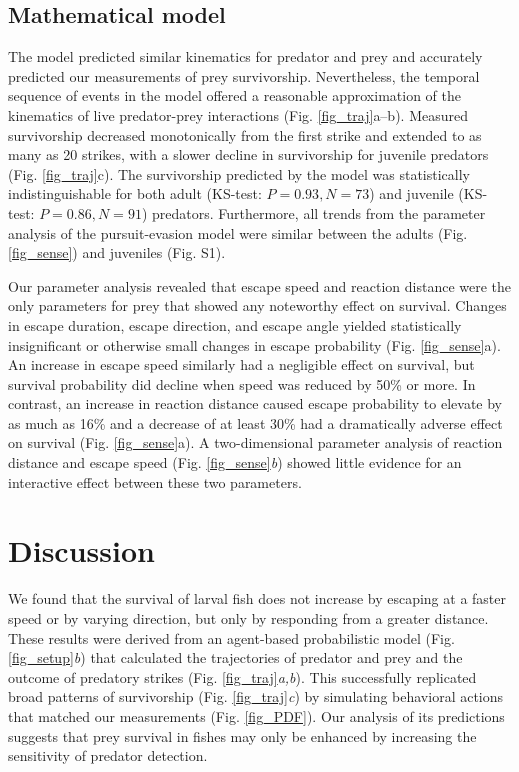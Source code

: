 \documentclass[]{rsos}%
\begin{document}
\subsection{Mathematical model} %

The model predicted similar kinematics for predator and prey and accurately predicted our measurements of prey survivorship. 
Nevertheless, the temporal sequence of events in the model offered a reasonable approximation of the kinematics of live predator-prey interactions (Fig. \ref{fig_traj}a--b).
Measured survivorship decreased monotonically from the first strike and extended to as many as 20 strikes, with a slower decline in survivorship  for juvenile predators (Fig. \ref{fig_traj}c).
The survivorship predicted by the model was statistically indistinguishable for both adult (KS-test: $P = 0.93, N = 73$) and juvenile (KS-test: $P = 0.86, N = 91$) predators. 
Furthermore, all trends from the parameter analysis of the pursuit-evasion model were similar between the adults (Fig. \ref{fig_sense}) and juveniles (Fig. S1). 

Our parameter analysis revealed that escape speed and reaction distance were the only parameters for prey that showed any noteworthy effect on survival. 
Changes in escape duration, escape direction, and escape angle yielded statistically insignificant or otherwise small changes in escape probability (Fig. \ref{fig_sense}a). 
An increase in escape speed similarly had a negligible effect on survival, but survival probability did decline when speed was reduced by 50\% or more.
In contrast, an increase in reaction distance caused escape probability to elevate by as much as 16\% and a decrease of at least 30\% had a dramatically adverse effect on survival (Fig. \ref{fig_sense}a). 
A two-dimensional parameter analysis of reaction distance and escape speed (Fig. \ref{fig_sense}\textit{b}) showed little evidence for an interactive effect between these two parameters.


\section{Discussion}%

We found that the survival of larval fish does not increase by escaping at a faster speed or by varying direction, but only by responding from a greater distance.
These results were derived from an agent-based probabilistic model (Fig. \ref{fig_setup}\textit{b}) that calculated the trajectories of predator and prey and the outcome of predatory strikes (Fig. \ref{fig_traj}\textit{a,b}). 
This  successfully replicated broad patterns of survivorship (Fig. \ref{fig_traj}\textit{c}) by simulating behavioral actions that matched our measurements (Fig. \ref{fig_PDF}).
Our analysis of its predictions suggests that prey survival in fishes may only be enhanced by increasing the sensitivity of predator detection.
\end{document}
